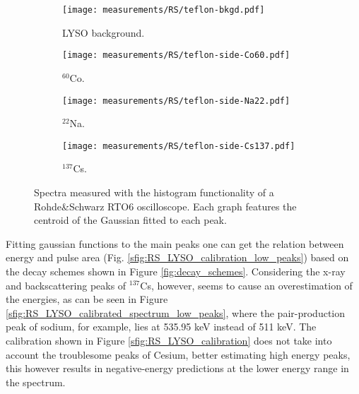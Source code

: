 \begin{figure}[H]
  \begin{subfigure}[t]{0.48\textwidth}
    \centering
    \texttt{[image: measurements/RS/teflon-bkgd.pdf]}
    \caption{\label{sfig:RS_bkgd}LYSO background.}
  \end{subfigure}
  \hfill
  \begin{subfigure}[t]{0.48\textwidth}
    \centering
    \texttt{[image: measurements/RS/teflon-side-Co60.pdf]}
    \caption{\label{sfig:RS_60Co}$^{60}$Co.}
  \end{subfigure}
  \medskip
  \begin{subfigure}[t]{0.48\textwidth}
    \centering
    \texttt{[image: measurements/RS/teflon-side-Na22.pdf]}
    \caption{\label{sfig:RS_22Na}$^{22}$Na.}
  \end{subfigure}
  \hfill
  \begin{subfigure}[t]{0.48\textwidth}
    \centering
    \texttt{[image: measurements/RS/teflon-side-Cs137.pdf]}
    \caption{\label{sfig:RS_137Cs}$^{137}$Cs.}
  \end{subfigure}
  \caption{\label{fig:RS_spectra}Spectra measured with the histogram functionality of a Rohde\&Schwarz RTO6 oscilloscope. Each graph features the centroid of the Gaussian fitted to each peak.}
\end{figure}

Fitting gaussian functions to the main peaks one can get the relation between energy and pulse area (Fig. \ref{sfig:RS_LYSO_calibration_low_peaks}) based on the decay schemes shown in Figure \ref{fig:decay_schemes}. Considering the x-ray and backscattering peaks of $^{137}$Cs, however, seems to cause an overestimation of the energies, as can be seen in Figure \ref{sfig:RS_LYSO_calibrated_spectrum_low_peaks}, where the pair-production peak of sodium, for example, lies at 535.95 keV instead of 511 keV. The calibration shown in Figure \ref{sfig:RS_LYSO_calibration} does not take into account the troublesome peaks of Cesium, better estimating high energy peaks, this however results in negative-energy predictions at the lower energy range in the spectrum.

